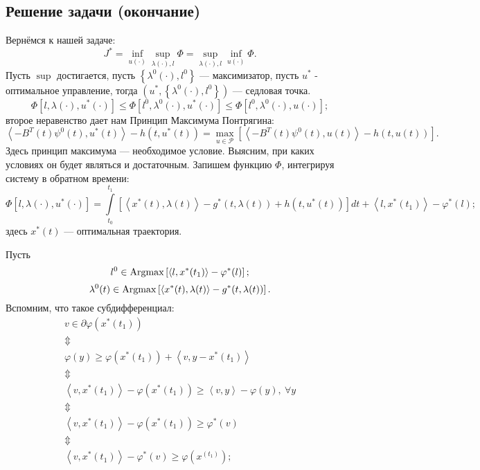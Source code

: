 \subsection{Решение задачи (окончание)}
\par Вернёмся к нашей задаче:
\begin{equation*}
J^*=\inf_{u(\cdot)}\sup_{\lambda(\cdot),l}\Phi=\sup_{\lambda(\cdot),l}\inf_{u(\cdot)}\Phi.
\end{equation*}
Пусть $ \sup $ достигается, пусть $ \left\lbrace \lambda^0(\cdot),l^0 \right\rbrace $ --- максимизатор, пусть $ u^* $ - оптимальное управление, тогда $ (u^*,\left\lbrace \lambda^0(\cdot),l^0 \right\rbrace) $ --- седловая точка.
\begin{equation*}
\Phi[l,\lambda(\cdot),u^*(\cdot)]\leqslant\Phi[l^0,\lambda^0(\cdot),u^*(\cdot)]\leqslant\Phi[l^0,\lambda^0(\cdot),u(\cdot)];
\end{equation*}
второе неравенство дает нам Принцип Максимума Понтрягина:
\begin{equation*}
\left<-B^T(t)\psi^0(t),u^*(t)\right> - h(t,u^*(t)) = \max_{u\in \mathcal{P}}\left[\left<-B^T(t)\psi^0(t),u(t)\right> - h(t,u(t))\right].
\end{equation*}
Здесь принцип максимума --- необходимое условие. Выясним, при каких условиях он будет являться и достаточным. Запишем функцию $\Phi$, интегрируя систему в обратном времени:
\begin{equation*}
\Phi[l,\lambda(\cdot),u^*(\cdot)]=\int\limits_{t_0}^{t_1}\left[ \left< x^*(t),\lambda(t) \right> -g^*(t,\lambda(t)) + h(t,u^*(t)) \right] dt + \left< l,x^*(t_1) \right> - \varphi^*(l);
\end{equation*}
здесь $x^*(t)$ --- оптимальная траектория.
\par Пусть
\begin{equation}\label{l^0}
l^0 \in \operatorname{Argmax} \left[ \left< l,x^*(t_1) \right> - \varphi^*(l) \right];
\end{equation}
\begin{equation}\label{lam^0}
\lambda^0(t) \in \operatorname{Argmax} \left[  \left< x^*(t),\lambda(t) \right> -g^*(t,\lambda(t)) \right].
\end{equation}
Вспомним, что такое субдифференциал:
\begin{equation*}
	\begin{array}{c}
	v \in \partial \varphi(x^*(t_1))\\
	\Updownarrow \\
	\varphi(y) \geqslant \varphi(x^*(t_1)) + \left< v,y-x^*(t_1) \right> \\
	\Updownarrow \\
	\left< v,x^*(t_1) \right> - \varphi(x^*(t_1)) \geqslant \left< v,y \right> - \varphi(y),~\forall y \\
	\Updownarrow \\
	\left< v,x^*(t_1) \right> - \varphi(x^*(t_1)) \geqslant \varphi^*(v) \\
	\Updownarrow \\
	\left< v,x^*(t_1) \right> - \varphi^*(v)\geqslant \varphi(x^(t_1));
	\end{array}
\end{equation*}

